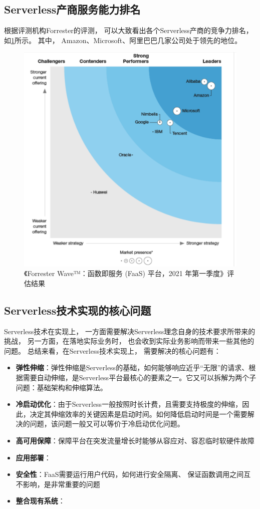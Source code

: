 \subsection{Serverless产商服务能力排名}
根据评测机构Forrester的评测，
可以大致看出各个Serverless产商的竞争力排名，
如\cref{faas_2021_q1_ranking}所示。
其中，
Amazon、Microsoft、阿里巴巴几家公司处于领先的地位。

\begin{figure}[ht!]
    \centering
    \includegraphics[width=0.7\linewidth]{images/faas-2021-q1.png}
    \caption{《Forrester Wave™：函数即服务 (FaaS) 平台，2021 年第一季度》评估结果\cite{serverless_report_2021}}
    \label{faas_2021_q1_ranking}
\end{figure}

\subsection{Serverless技术实现的核心问题}

Serverless技术在实现上，
一方面需要解决Serverless理念自身的技术要求所带来的挑战，
另一方面，在落地实际业务时，
也会收到实际业务影响而带来一些其他的问题。
总结来看，在Serverless技术实现上，
需要解决的核心问题有：

\begin{itemize}
    \item \textbf{弹性伸缩}：弹性伸缩是Serverless的基础，如何能够响应近乎“无限”的请求、根据需要自动伸缩，是Serverless平台最核心的要素之一。它又可以拆解为两个子问题：基础架构和伸缩算法。
    \item \textbf{冷启动优化}：由于Serverless一般按照时长计费，且需要支持极度的伸缩，因此，决定其伸缩效率的关键因素是启动时间。如何降低启动时间是一个需要解决的问题，该问题一般又可以等价于冷启动优化问题。
    \item \textbf{高可用保障}：保障平台在突发流量增长时能够从容应对、容忍临时软硬件故障
    \item \textbf{应用部署}：
    \item \textbf{安全性}：FaaS需要运行用户代码，如何进行安全隔离、
        保证函数调用之间互不影响，是非常重要的问题
    \item \textbf{整合现有系统}：
\end{itemize}